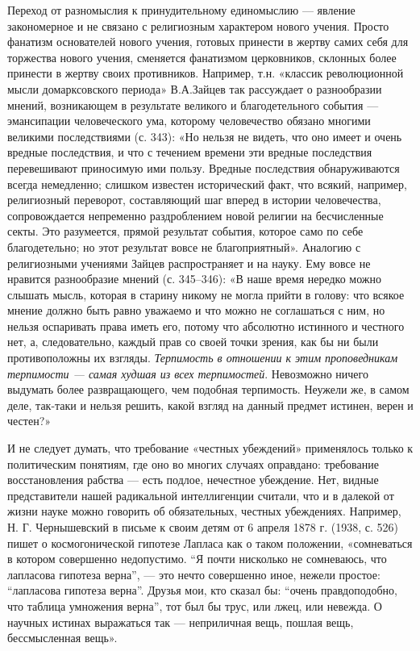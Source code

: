 Переход  от  разномыслия  к принудительному  единомыслию  ---  явление
закономерное  и не  связано  с религиозным  характером нового  учения.
Просто  фанатизм   основателей  нового  учения,  готовых   принести  в
жертву самих  себя для  торжества нового учения,  сменяется фанатизмом
церковников,  склонных  более  принести в  жертву  своих  противников.
Например,  т.н. «классик  революционной мысли  домарксовского периода»
В.А.Зайцев  так  рассуждает  о   разнообразии  мнений,  возникающем  в
результате   великого  и   благодетельного  события   ---  эмансипации
человеческого  ума,  которому  человечество обязано  многими  великими
последствиями (с.  343): «Но нельзя не  видеть, что оно имеет  и очень
вредные последствия, и что с  течением времени эти вредные последствия
перевешивают приносимую ими пользу. Вредные последствия обнаруживаются
всегда  немедленно; слишком  известен исторический  факт, что  всякий,
например,  религиозный переворот,  составляющий шаг  вперед в  истории
человечества, сопровождается непременно раздроблением новой религии на
бесчисленные секты. Это разумеется,  прямой результат события, которое
само по себе благодетельно; но этот результат вовсе не благоприятный».
Аналогию с религиозными учениями Зайцев распространяет и на науку. Ему
вовсе не  нравится разнообразие  мнений (с.  345--346): «В  наше время
нередко можно слышать мысль, которая  в старину никому не могла прийти
в голову: что всякое мнение должно  быть равно уважаемо и что можно не
соглашаться с  ним, но нельзя  оспаривать права иметь его,  потому что
абсолютно истинного и  честного нет, а, следовательно,  каждый прав со
своей  точки  зрения,  как  бы  ни  были  противоположны  их  взгляды.
\textit{Терпимость  в отношении  к этим  проповедникам терпимости  ---
самая худшая  из всех  терпимостей}. Невозможно ничего  выдумать более
развращающего,  чем подобная  терпимость.  Неужели же,  в самом  деле,
так-таки  и нельзя  решить, какой  взгляд на  данный предмет  истинен,
верен и честен?»

И не  следует думать,  что требование «честных  убеждений» применялось
только к политическим  понятиям, где оно во  многих случаях оправдано:
требование   восстановления  рабства   ---   есть  подлое,   нечестное
убеждение. Нет,  видные представители нашей  радикальной интеллигенции
считали,  что   и  в  далекой   от  жизни  науке  можно   говорить  об
обязательных,  честных  убеждениях.  Например, Н.  Г.  Чернышевский  в
письме  к своим  детям от  6 апреля  1878 г.  (1938, с.  526) пишет  о
космогонической гипотезе Лапласа как о таком положении, «сомневаться в
котором совершенно недопустимо. ``Я почти нисколько не сомневаюсь, что
лапласова  гипотеза верна'',  ---  это нечто  совершенно иное,  нежели
простое:  ``лапласова гипотеза  верна''.  Друзья мои,  кто сказал  бы:
``очень  правдоподобно,  что таблица  умножения  верна'',  тот был  бы
трус,  или лжец,  или невежда.  О научных  истинах выражаться  так ---
неприличная вещь, пошлая вещь, бессмысленная вещь».

